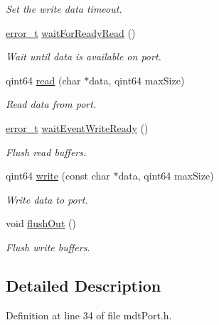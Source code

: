 \begin{DoxyCompactItemize}
\begin{DoxyCompactList}\small\item\em Set the write data timeout. \end{DoxyCompactList}\item 
\hyperlink{classmdt_abstract_port_ad4121bb930c95887e77f8bafa065a85e}{error\_\-t} \hyperlink{classmdt_port_a84594fdb56cd455a366c69b0a9228020}{waitForReadyRead} ()
\begin{DoxyCompactList}\small\item\em Wait until data is available on port. \end{DoxyCompactList}\item 
qint64 \hyperlink{classmdt_port_ad8a196bb21b6ca76dffb068a1692904a}{read} (char $\ast$data, qint64 maxSize)
\begin{DoxyCompactList}\small\item\em Read data from port. \end{DoxyCompactList}\item 
\hyperlink{classmdt_abstract_port_ad4121bb930c95887e77f8bafa065a85e}{error\_\-t} \hyperlink{classmdt_port_a85e77a391f6f5782428beb2e6aee52f8}{waitEventWriteReady} ()
\begin{DoxyCompactList}\small\item\em Flush read buffers. \end{DoxyCompactList}\item 
qint64 \hyperlink{classmdt_port_a62f4a6f2c547d40d3743ce893e0f64d6}{write} (const char $\ast$data, qint64 maxSize)
\begin{DoxyCompactList}\small\item\em Write data to port. \end{DoxyCompactList}\item 
\hypertarget{classmdt_port_a42022f9fe08166418711b956c6aabb49}{
void \hyperlink{classmdt_port_a42022f9fe08166418711b956c6aabb49}{flushOut} ()}
\label{classmdt_port_a42022f9fe08166418711b956c6aabb49}

\begin{DoxyCompactList}\small\item\em Flush write buffers. \end{DoxyCompactList}\end{DoxyCompactItemize}


\subsection{Detailed Description}


Definition at line 34 of file mdtPort.h.



